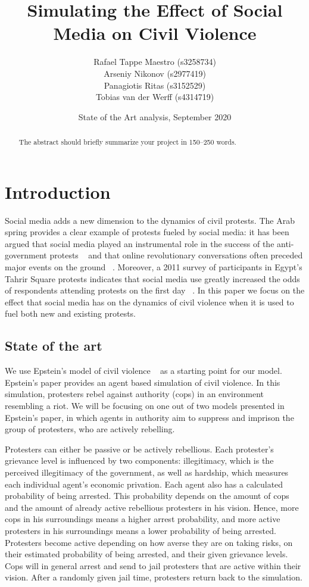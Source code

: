 \documentclass[a4paper,11pt]{article}
\title{Simulating the Effect of Social Media on Civil Violence}
\author{
  Rafael Tappe Maestro (s3258734)
  \\
  Arseniy Nikonov (s2977419)
  \\
  Panagiotis Ritas (s3152529)
  \\
  Tobias van der Werff (s4314719)
}
\date{State of the Art analysis, September 2020}
\begin{document}
\maketitle

\begin{abstract}
The abstract should briefly summarize your project in 150--250 words.
\end{abstract}

\section{Introduction}

Social media adds a new dimension to the dynamics of civil protests. The Arab spring provides a clear example of protests fueled by social media: it has been argued that social media played an instrumental role in the success of the anti-government protests ~\cite{eltantawy2011arab} and that online revolutionary conversations often preceded major events on the ground ~\cite{howard2011opening}. Moreover, a 2011 survey of participants in Egypt’s  Tahrir Square protests indicates that social media use greatly increased the  odds of respondents attending protests on the first day ~\cite{tufekci2012social}.  In this paper we focus on the effect that social media has on the dynamics of civil violence when it is used to fuel both new and existing protests. 

\subsection{State of the art}

We use Epstein’s model of civil violence ~\cite{epstein2002modeling} as a starting point for our model. Epstein’s paper provides an agent based simulation of civil violence. In this simulation, protesters rebel against authority (cops) in an environment resembling a riot. We will be focusing on one out of two models presented in Epstein’s paper, in which agents in authority aim to suppress and imprison the group of protesters, who are actively rebelling.
    
Protesters can either be passive or be actively rebellious. Each protester's grievance level is influenced by two components: illegitimacy, which is the perceived illegitimacy of the government, as well as hardship, which measures each individual agent's economic privation.  Each agent also has a calculated probability of being arrested. This probability depends on the amount of cops and the amount of already active rebellious protesters in his vision. Hence, more cops in his surroundings means a higher arrest probability, and more active protesters in his surroundings means a lower probability of being arrested. Protesters become active depending on how averse they are on taking risks, on their estimated probability of being arrested, and their given grievance levels. Cops will in general arrest and send to jail protesters that are active within their vision. After a randomly given jail time, protesters return back to the simulation.
\end{document}
